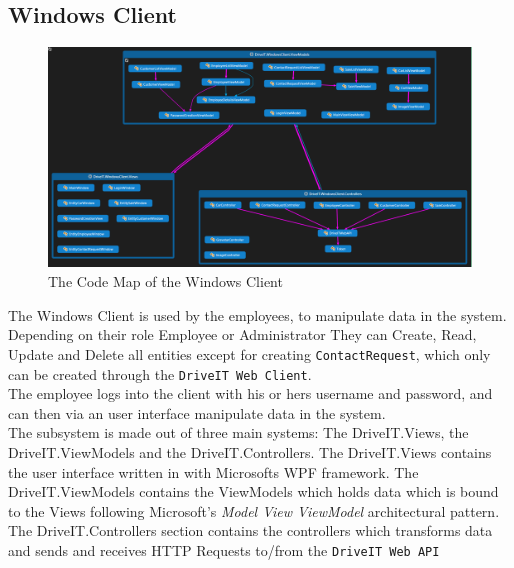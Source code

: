 \subsection{Windows Client} 
\begin{figure}[H]
	\centering
	\includegraphics[scale=0.35]{Figures/WindowsClientCodeMap}
	\caption{The Code Map of the Windows Client}
	\label{fig:WindowsClientCodeMap}
\end{figure}
The Windows Client is used by the employees, to manipulate data in the system. Depending on their role Employee or Administrator They can Create, Read, Update and Delete all entities except for creating \texttt{ContactRequest}, which only can be created through the \texttt{DriveIT Web Client}.\\
The employee logs into the client with his or hers username and password, and can then via an user interface manipulate data in the system.\\
The subsystem is made out of three main systems: The DriveIT.Views, the DriveIT.ViewModels and the DriveIT.Controllers. The DriveIT.Views contains the user interface written in with Microsofts WPF framework. The DriveIT.ViewModels contains the ViewModels which holds data which is bound to the Views following Microsoft's \emph{Model View ViewModel} architectural pattern. The DriveIT.Controllers section contains the controllers which transforms data and sends and receives HTTP Requests to/from the \texttt{DriveIT Web API}

